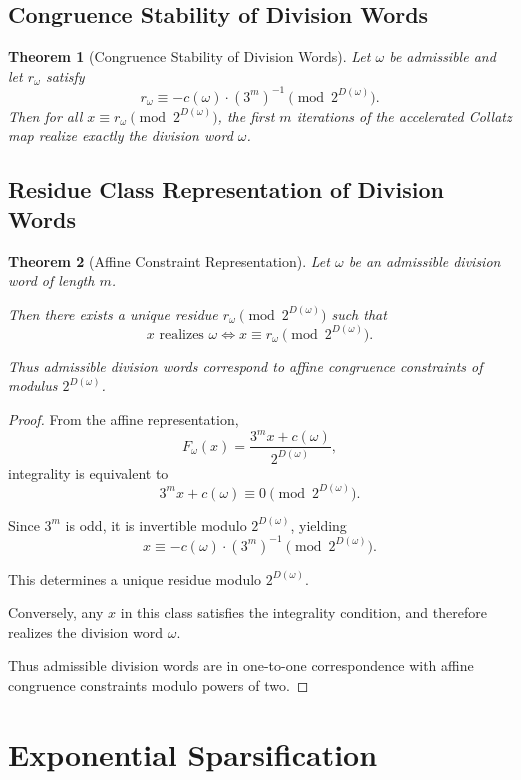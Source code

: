 \documentclass[12pt, oneside]{article}
\numberwithin{equation}{section}
\theoremstyle{definition}
\theoremstyle{plain}
\newtheorem{theorem}{Theorem}[section]
\theoremstyle{remark}
\begin{document}
\subsection{Congruence Stability of Division Words}

\begin{theorem}[Congruence Stability of Division Words]
Let $\omega$ be admissible and let $r_\omega$ satisfy
\[
r_\omega \equiv -c(\omega)\cdot (3^m)^{-1} \pmod{2^{D(\omega)}}.
\]
Then for all $x \equiv r_\omega \pmod{2^{D(\omega)}}$, the first $m$
iterations of the accelerated Collatz map realize exactly the division word $\omega$.
\end{theorem}

\subsection{Residue Class Representation of Division Words}

\begin{theorem}[Affine Constraint Representation]
Let $\omega$ be an admissible division word of length $m$.

Then there exists a unique residue $r_\omega \pmod{2^{D(\omega)}}$ such that
\[
x \text{ realizes } \omega \iff x \equiv r_\omega \pmod{2^{D(\omega)}}.
\]

Thus admissible division words correspond to affine congruence constraints
of modulus $2^{D(\omega)}$.
\end{theorem}

\begin{proof}
From the affine representation,
\[
F_\omega(x) = \frac{3^m x + c(\omega)}{2^{D(\omega)}},
\]
integrality is equivalent to
\[
3^m x + c(\omega) \equiv 0 \pmod{2^{D(\omega)}}.
\]

Since $3^m$ is odd, it is invertible modulo $2^{D(\omega)}$, yielding
\[
x \equiv -c(\omega) \cdot (3^m)^{-1} \pmod{2^{D(\omega)}}.
\]

This determines a unique residue modulo $2^{D(\omega)}$.

Conversely, any $x$ in this class satisfies the integrality condition,
and therefore realizes the division word $\omega$.

Thus admissible division words are in one-to-one correspondence with affine
congruence constraints modulo powers of two.
\end{proof}

\section{Exponential Sparsification}
\end{document}

